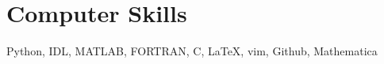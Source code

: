 \documentclass[letterpaper,10pt]{article}
\begin{document}
\section{Computer Skills}
\hspace*{0.5em}
Python, IDL, MATLAB, FORTRAN, C, \LaTeX, vim, Github, Mathematica


%
%
%
\end{document}
